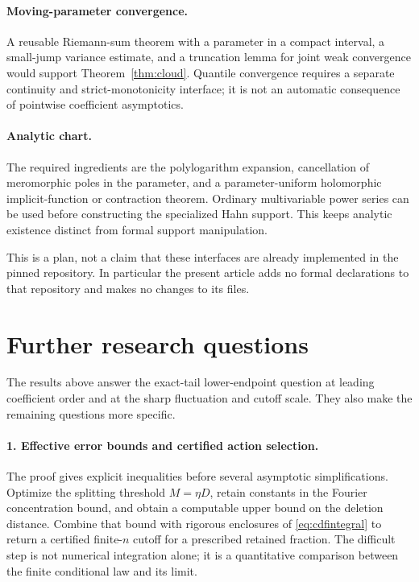 \documentclass[11pt,a4paper]{article}
\numberwithin{equation}{section}
\theoremstyle{definition}
\theoremstyle{remark}
\begin{document}
\paragraph{Moving-parameter convergence.}
A reusable Riemann-sum theorem with a parameter in a compact interval,
a small-jump variance estimate, and a truncation lemma for joint weak
convergence would support Theorem~\ref{thm:cloud}. Quantile convergence
requires a separate continuity and strict-monotonicity interface; it is
not an automatic consequence of pointwise coefficient asymptotics.

\paragraph{Analytic chart.}
The required ingredients are the polylogarithm expansion, cancellation of
meromorphic poles in the parameter, and a parameter-uniform holomorphic
implicit-function or contraction theorem. Ordinary multivariable power
series can be used before constructing the specialized Hahn support.
This keeps analytic existence distinct from formal support manipulation.

This is a plan, not a claim that these interfaces are already implemented
in the pinned repository. In particular the present article adds no
formal declarations to that repository and makes no changes to its files.

\section{Further research questions}
\label{sec:future}
The results above answer the exact-tail lower-endpoint question at leading
coefficient order and at the sharp fluctuation and cutoff scale. They also
make the remaining questions more specific.

\paragraph{1. Effective error bounds and certified action selection.}
The proof gives explicit inequalities before several asymptotic
simplifications. Optimize the splitting threshold $M=\eta D$, retain
constants in the Fourier concentration bound, and obtain a computable
upper bound on the deletion distance. Combine that bound with rigorous
enclosures of \eqref{eq:cdfintegral} to return a certified finite-$n$
cutoff for a prescribed retained fraction. The difficult step is not
numerical integration alone; it is a quantitative comparison between the
finite conditional law and its limit.
\end{document}
